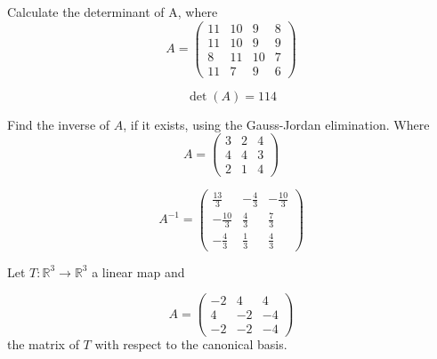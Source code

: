 \begin{questions}

\question Calculate the determinant of A, where
$$
A=\left(\begin{array}{rrrr}
11 & 10 & 9 & 8 \\
11 & 10 & 9 & 9 \\
8 & 11 & 10 & 7 \\
11 & 7 & 9 & 6
\end{array}\right)
$$

\begin{solution}
$$\det(A)=114$$
\end{solution}

\question Find the inverse of $A$, if it exists, using the Gauss-Jordan elimination. Where
$$
A=\left(\begin{array}{rrr}
3 & 2 & 4 \\
4 & 4 & 3 \\
2 & 1 & 4
\end{array}\right)
$$

\begin{solution}
$$A^{-1}=\left(\begin{array}{rrr}
\frac{13}{3} & -\frac{4}{3} & -\frac{10}{3} \\
-\frac{10}{3} & \frac{4}{3} & \frac{7}{3} \\
-\frac{4}{3} & \frac{1}{3} & \frac{4}{3}
\end{array}\right)$$
\end{solution}

\question Let $T:\mathbb{R}^3\rightarrow\mathbb{R}^3$  a linear map and
 
$$
A=\left(\begin{array}{rrr}
-2 & 4 & 4 \\
4 & -2 & -4 \\
-2 & -2 & -4
\end{array}\right)
$$
the matrix of $T$ with respect to the canonical basis.
\end{questions}
